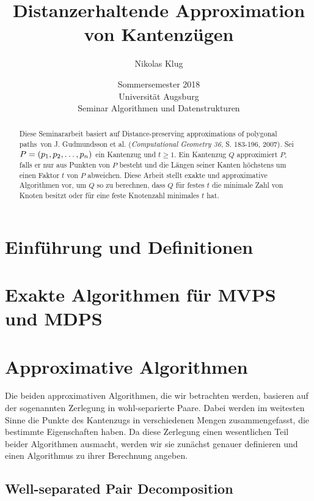 \documentclass[11pt]{article}
\title{Distanzerhaltende Approximation von Kantenzügen}
\author{Nikolas Klug}
\date{Sommersemester 2018
	\\ Universität Augsburg
	\\ Seminar Algorithmen und Datenstrukturen
	}
\begin{document}
    \maketitle

    \begin{abstract}
        Diese Seminararbeit basiert auf \glqq Distance-preserving approximations of polygonal paths\grqq\ von J. Gudmundsson et al. (\textit{Computational Geometry 36}, S. 183-196, 2007). 
        Sei $P = (p_1, p_2, \mathellipsis, p_n)$ ein Kantenzug und $t \geq 1$. Ein Kantenzug $Q$ approximiert $P$, falls er nur aus Punkten von $P$ besteht und die Längen seiner Kanten höchstens um einen Faktor $t$ von $P$ abweichen. 
        Diese Arbeit stellt exakte und approximative Algorithmen vor, um $Q$ so zu berechnen, dass $Q$ für festes $t$ die minimale Zahl von Knoten besitzt oder für eine feste Knotenzahl minimales $t$ hat.
    \end{abstract}

    \section{Einführung und Definitionen}
    \label{sec:intro}
	

    \section{Exakte Algorithmen für MVPS und MDPS}
    \label{sec:exact}
    
    
    \section{Approximative Algorithmen}
    \label{sec:approximative}
    
    Die beiden approximativen Algorithmen, die wir betrachten werden, basieren auf der sogenannten Zerlegung in wohl-separierte Paare. Dabei werden im weitesten Sinne die Punkte des Kantenzugs in verschiedenen Mengen zusammengefasst, die bestimmte Eigenschaften haben. Da diese Zerlegung einen wesentlichen Teil beider Algorithmen ausmacht, werden wir sie zunächst genauer definieren und einen Algorithmus zu ihrer Berechnung angeben.

    \subsection{Well-separated Pair Decomposition}
    \label{subsec:wspd}
    
    
\end{document}
